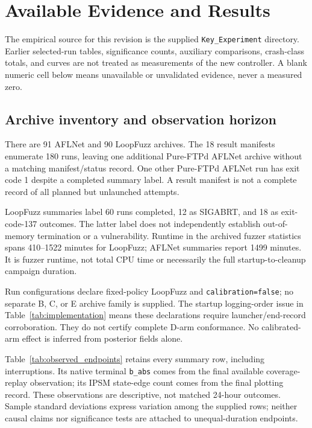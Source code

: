 \documentclass[final,5p,times,number]{elsarticle}
\begin{document}
\section{Available Evidence and Results}
\label{sec:results}
The empirical source for this revision is the supplied \texttt{Key\_Experiment} directory. Earlier selected-run tables, significance counts, auxiliary comparisons, crash-class totals, and curves are not treated as measurements of the new controller. A blank numeric cell below means unavailable or unvalidated evidence, never a measured zero.

\subsection{Archive inventory and observation horizon}
There are 91 AFLNet and 90 LoopFuzz archives. The 18 result manifests enumerate 180 runs, leaving one additional Pure-FTPd AFLNet archive without a matching manifest/status record. One other Pure-FTPd AFLNet run has exit code 1 despite a completed summary label. A result manifest is not a complete record of all planned but unlaunched attempts.

LoopFuzz summaries label 60 runs completed, 12 as SIGABRT, and 18 as exit-code-137 outcomes. The latter label does not independently establish out-of-memory termination or a vulnerability. Runtime in the archived fuzzer statistics spans 410--1522 minutes for LoopFuzz; AFLNet summaries report 1499 minutes. It is fuzzer runtime, not total CPU time or necessarily the full startup-to-cleanup campaign duration.

Run configurations declare fixed-policy LoopFuzz and \texttt{calibration=false}; no separate B, C, or E archive family is supplied. The startup logging-order issue in Table~\ref{tab:implementation} means these declarations require launcher/end-record corroboration. They do not certify complete D-arm conformance. No calibrated-arm effect is inferred from posterior fields alone.



Table~\ref{tab:observed_endpoints} retains every summary row, including interruptions. Its native terminal \texttt{b\_abs} comes from the final available coverage-replay observation; its IPSM state-edge count comes from the final plotting record. These observations are descriptive, not matched 24-hour outcomes. Sample standard deviations express variation among the supplied rows; neither causal claims nor significance tests are attached to unequal-duration endpoints.
\end{document}
